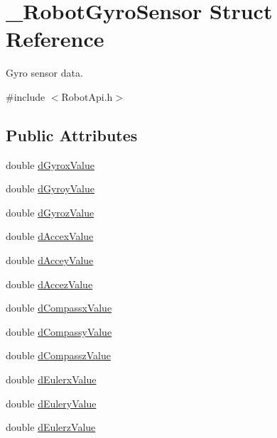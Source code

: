 \hypertarget{struct__RobotGyroSensor}{}\section{\+\_\+\+Robot\+Gyro\+Sensor Struct Reference}
\label{struct__RobotGyroSensor}


Gyro sensor data.  




{\ttfamily \#include $<$Robot\+Api.\+h$>$}

\subsection*{Public Attributes}
\begin{DoxyCompactItemize}
\item 
double \hyperlink{struct__RobotGyroSensor_a91d4a3ae87bab30dfcd0338249e435f4}{d\+Gyrox\+Value}
\item 
double \hyperlink{struct__RobotGyroSensor_a680c6b5d38816f4ec00b17da210d232a}{d\+Gyroy\+Value}
\item 
double \hyperlink{struct__RobotGyroSensor_a7294f5008f4215b13022d0f2e467d699}{d\+Gyroz\+Value}
\item 
double \hyperlink{struct__RobotGyroSensor_a97eb6256affeaa07f5ab6f395d5c1920}{d\+Accex\+Value}
\item 
double \hyperlink{struct__RobotGyroSensor_a1a4ef02d86889de34db54eac401ad877}{d\+Accey\+Value}
\item 
double \hyperlink{struct__RobotGyroSensor_a85a5d81f93840612f5cf45bef4281f8e}{d\+Accez\+Value}
\item 
double \hyperlink{struct__RobotGyroSensor_aa6563418e0328d8ced1004a74ec4f4c1}{d\+Compassx\+Value}
\item 
double \hyperlink{struct__RobotGyroSensor_aead0ecac12a78d2112621fd4c308c031}{d\+Compassy\+Value}
\item 
double \hyperlink{struct__RobotGyroSensor_a752fbdd33849fcf1d893f53f502d7a0d}{d\+Compassz\+Value}
\item 
double \hyperlink{struct__RobotGyroSensor_aa5c27e7d7f4938e185b557b547419b51}{d\+Eulerx\+Value}
\item 
double \hyperlink{struct__RobotGyroSensor_a4d3b6fdf22b51d73bf89936aa3e80dc5}{d\+Eulery\+Value}
\item 
double \hyperlink{struct__RobotGyroSensor_a3bae147fe452610da4be3b125e28ea21}{d\+Eulerz\+Value}
\end{DoxyCompactItemize}


